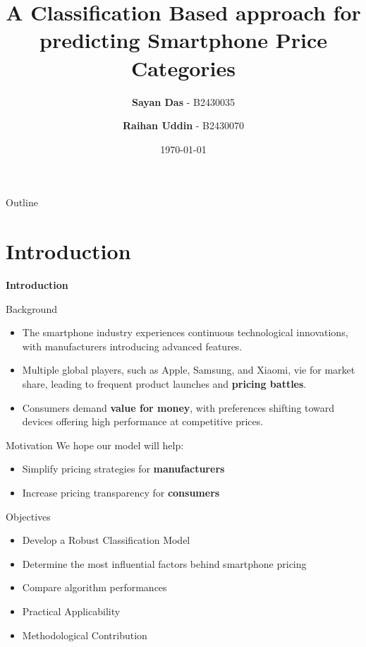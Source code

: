 \documentclass[14pt, aspectratio=169]{beamer}
\title{A Classification Based approach for predicting Smartphone Price Categories}
\author{\textbf{Sayan Das} - B2430035 \and \textbf{Raihan Uddin} - B2430070}
\date{\today}
\begin{document}
\maketitle

\begin{frame}{Outline}
  \tableofcontents
\end{frame}



\section{Introduction}
\begin{frame}{}
  \Huge
  \centering
  \textbf{Introduction}
  \normalsize
\end{frame}
\begin{frame}{Background}
    \begin{itemize}
      \item The smartphone industry experiences continuous technological innovations, with manufacturers introducing advanced features.
      \item Multiple global players, such as Apple, Samsung, and Xiaomi, vie for market share, leading to frequent product launches and \textbf{pricing battles}.
      \item Consumers demand \textbf{value for money}, with preferences shifting toward devices offering high performance at competitive prices.
  \end{itemize}
\end{frame}
\begin{frame}{Motivation}
  We hope our model will help:
  \vspace{1.25em}
  \begin{itemize}
	\setlength\itemsep{1em}
    \item<1-> Simplify pricing strategies for \textbf{manufacturers}
    \item<2-> Increase pricing transparency for \textbf{consumers}
  \end{itemize}
\end{frame}
\begin{frame}{Objectives}
  \begin{itemize}
	\setlength\itemsep{0.75em}
    \item<1-> Develop a Robust Classification Model
    \item<2-> Determine the most influential factors behind smartphone pricing
    \item<3-> Compare algorithm performances
    \item<4-> Practical Applicability
    \item<5-> Methodological Contribution
  \end{itemize}
\end{frame}
\end{document}
